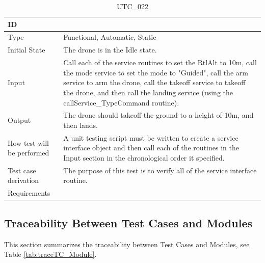 \documentclass[12pt, titlepage]{article}
\begin{document}
\begin{table}[!h]
\begin{center}
\caption {UTC\_022}
\label{tab:UTC_022}
\begin{tabular}{ | m{3.2cm} | m{12.2cm} | } 
\hline
ID & \nameref{tab:UTC_022} \\ 
\hline
Type &  Functional, Automatic, Static  \\ 
\hline
Initial State & The drone is in the Idle state. \\ 
\hline
Input & Call each of the service routines to set the RtlAlt to 10m, call the mode service to set the mode to "Guided", call the arm service to arm the drone, call the takeoff service to takeoff the drone, and then call the landing service (using the callService_TypeCommand routine). \\ 
\hline
Output &  The drone should takeoff the ground to a height of 10m, and then lands. \\ 
\hline
How test will be performed & A unit testing script must be written to create a service interface object and then call each of the routines in the Input section in the chronological order it specified.\\ 
\hline
Test case derivation & The purpose of this test is to verify all of the service interface routine. \\ 
\hline
Requirements &  \\ 
\hline
\end{tabular}
\end{center}
\end{table}

\clearpage

\subsection{Traceability Between Test Cases and Modules}
This section summarizes the traceability between Test Cases and Modules, see Table \ref{tab:traceTC_Module}. 
\end{document}
